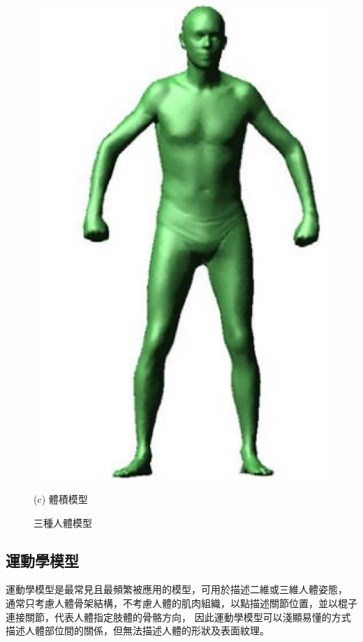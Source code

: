 \begin{figure}[!ht]
\begin{minipage}{.33\textwidth}
      \includegraphics[width=.95\linewidth]{figure/ch2_fig_personal_planar_model.png}
      \caption*{(c) 體積模型}
    \end{minipage}
    \captionsetup{justification=centering}
    \caption[三種人體模型]{三種人體模型}
    \label{ch2_fig_personal_model}
 \end{figure}

\subsection*{運動學模型}
運動學模型是最常見且最頻繁被應用的模型，可用於描述二維或三維人體姿態，
通常只考慮人體骨架結構，不考慮人體的肌肉組織，以點描述關節位置，並以棍子連接關節，代表人體指定肢體的骨骼方向，
因此運動學模型可以淺顯易懂的方式描述人體部位間的關係，但無法描述人體的形狀及表面紋理。

